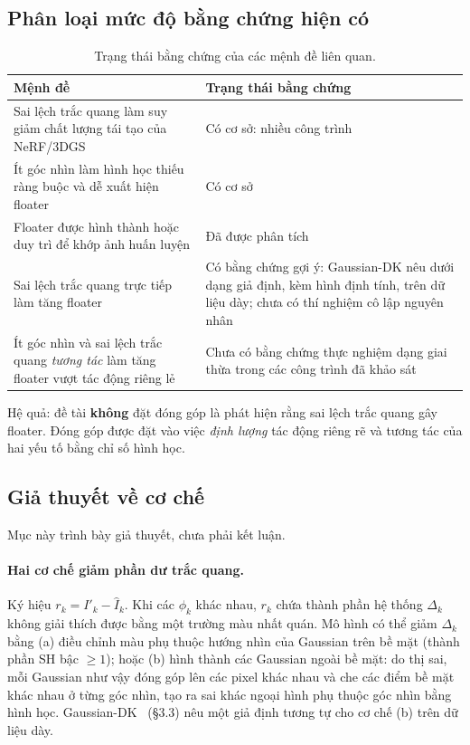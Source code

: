 \documentclass[11pt,a4paper]{article}
\begin{document}
\subsection{Phân loại mức độ bằng chứng hiện có}
\label{sec:evidence}
\begin{table}[H]
\centering\small
\caption{Trạng thái bằng chứng của các mệnh đề liên quan.}
\label{tab:evidence}
\begin{tabularx}{\textwidth}{@{}Y Y@{}}
\toprule
Mệnh đề & Trạng thái bằng chứng \\
\midrule
Sai lệch trắc quang làm suy giảm chất lượng tái tạo của NeRF/3DGS & Có cơ sở: nhiều công trình~\cite{nerfw,vastgaussian,bilarf,gaussiandk,luminancegs} \\
Ít góc nhìn làm hình học thiếu ràng buộc và dễ xuất hiện floater & Có cơ sở~\cite{sparsegs,fsgs,corgs,adgs,icogs} \\
Floater được hình thành hoặc duy trì để khớp ảnh huấn luyện & Đã được phân tích~\cite{adgs,icogs} \\
Sai lệch trắc quang trực tiếp làm tăng floater & Có bằng chứng gợi ý: Gaussian-DK nêu dưới dạng giả định, kèm hình định tính, trên dữ liệu dày; chưa có thí nghiệm cô lập nguyên nhân \\
Ít góc nhìn và sai lệch trắc quang \emph{tương tác} làm tăng floater vượt tác động riêng lẻ & Chưa có bằng chứng thực nghiệm dạng giai thừa trong các công trình đã khảo sát \\
\bottomrule
\end{tabularx}
\end{table}
Hệ quả: đề tài \textbf{không} đặt đóng góp là phát hiện rằng sai lệch trắc quang gây floater. Đóng góp được đặt vào việc \emph{định lượng} tác động riêng rẽ và tương tác của hai yếu tố bằng chỉ số hình học.

\subsection{Giả thuyết về cơ chế}
\label{sec:mechanism}
Mục này trình bày giả thuyết, chưa phải kết luận.

\paragraph{Hai cơ chế giảm phần dư trắc quang.} Ký hiệu $r_k = I'_k - \hat I_k$. Khi các $\phi_k$ khác nhau, $r_k$ chứa thành phần hệ thống $\Delta_k$ không giải thích được bằng một trường màu nhất quán. Mô hình có thể giảm $\Delta_k$ bằng (a) điều chỉnh màu phụ thuộc hướng nhìn của Gaussian trên bề mặt (thành phần SH bậc $\ge 1$); hoặc (b) hình thành các Gaussian ngoài bề mặt: do thị sai, mỗi Gaussian như vậy đóng góp lên các pixel khác nhau và che các điểm bề mặt khác nhau ở từng góc nhìn, tạo ra sai khác ngoại hình phụ thuộc góc nhìn bằng hình học. Gaussian-DK~\cite{gaussiandk} (§3.3) nêu một giả định tương tự cho cơ chế (b) trên dữ liệu dày.
\end{document}
